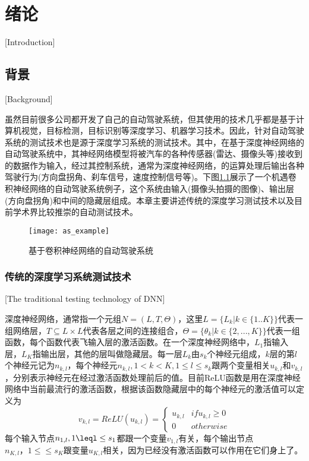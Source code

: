 \newcommand{\specialcell}[2][c]{%
  \begin{tabular}[#1]{@{}c@{}}#2\end{tabular}}
\newcommand{\mthead}[1]{\textit{\textbf{#1}}}

\newcommand{\newmodel}[1]{\textbf{#1.}\cite{#1}\quad}

\chapter{绪论}[Introduction]

\section{背景}[Background]

虽然目前很多公司都开发了自己的自动驾驶系统，但其使用的技术几乎都是基于计算机视觉，目标检测，目标识别等深度学习、机器学习技术。因此，针对自动驾驶系统的测试技术也是源于深度学习系统的测试技术。其中，在基于深度神经网络的自动驾驶系统中，其神经网络模型将被汽车的各种传感器(雷达、摄像头等)接收到的数据作为输入，经过其控制系统，通常为深度神经网络，的运算处理后输出各种驾驶行为(方向盘拐角、刹车信号，速度控制信号等)。下图\ref{as_example}展示了一个机遇卷积神经网络的自动驾驶系统例子，这个系统由输入(摄像头拍摄的图像)、输出层(方向盘拐角)和中间的隐藏层组成。本章主要讲述传统的深度学习测试技术以及目前学术界比较推崇的自动测试技术。

\begin{figure}[h]
    \centering
    \texttt{[image: as\_example]}
    \caption{基于卷积神经网络的自动驾驶系统\cite{DeepRoad}}
    \label{as_example}
\end{figure}

\subsection{传统的深度学习系统测试技术}[The traditional testing technology of DNN]

深度神经网络，通常指一个元组$N=(L,T,\Theta)$，这里$L=\{L_k|k\in \{1..K\}\}$代表一组网络层，$T\subseteq L\times L$代表各层之间的连接组合，$\Theta=\{\theta_k|k\in \{2,...,K\}\}$代表一组函数，每个函数代表飞输入层的激活函数。在一个深度神经网络中，$L_1$指输入层，$L_K$指输出层，其他的层叫做隐藏层。每一层$L_k$由$s_k$个神经元组成，$k$层的第$l$个神经元记为$n_{k,l}$，每个神经元$n_{k,l},1\lt k \lt K, 1\leq l\leq s_k$跟两个变量相关$u_{k,l}$和$v_{k,l}$，分别表示神经元在经过激活函数处理前后的值。目前ReLU\cite{relu}函数是用在深度神经网络中当前最流行的激活函数，根据该函数隐藏层中的每个神经元的激活值可以定义为
$$v_{k,l}=ReLU(u_{k,l})=\begin{cases}
    u_{k,l} & if u_{k,l} \geq 0 \\
    0 & otherwise
\end{cases}$$
每个输入节点$n_{1,l}, 1\leql \leq s_1$都跟一个变量$v_{1,l}$有关，每个输出节点$n_{K,l}，1\leq \leq s_K$跟变量$u_{K,l}$相关，因为已经没有激活函数可以作用在它们身上了。

